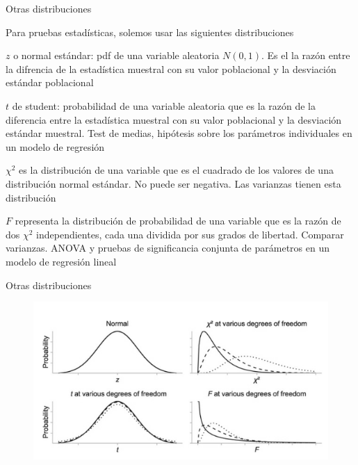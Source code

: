 \documentclass{beamer}
\begin{document}
\begin{frame}{Otras distribuciones}

Para pruebas estadísticas, solemos usar las siguientes distribuciones

\begin{itemize}
\small{
    \item $z$ o normal estándar: pdf de una variable aleatoria $N(0,1)$. Es el la razón entre la difrencia de la estadística muestral con su valor poblacional y la desviación estándar poblacional
    \item $t$ de student: probabilidad de una variable aleatoria que es la razón de la diferencia entre la estadística muestral con su valor poblacional y la desviación estándar muestral. Test de medias, hipótesis sobre los parámetros individuales en un modelo de regresión
    \item $\chi ^2$ es la distribución de una variable que es el cuadrado de los valores de una distribución normal estándar. No puede ser negativa. Las varianzas tienen esta distribución
    \item $F$ representa la distribución de probabilidad de una variable que es la razón de dos $\chi ^2$ independientes, cada una dividida por sus grados de libertad. Comparar varianzas. ANOVA y pruebas de significancia conjunta de parámetros en un modelo de regresión lineal
    }
\end{itemize}
    
\end{frame}

\begin{frame}{Otras distribuciones}

\begin{figure}
\centering
        \includegraphics[scale=0.8]{distribuciones.PNG}
        
        \end{figure}
    
\end{frame}
\end{document}
